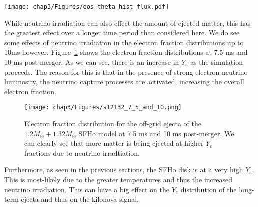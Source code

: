 \begin{figure*}[!htbp]
  \texttt{[image: chap3/Figures/eos\_theta\_hist\_flux.pdf]}
\caption{
  Neutrino flux density moment as a function of angle for different EOS runs at 7.5ms. The angle is defined with respect to the equatorial plane with $0^\circ$ being the equator, and $\pm 90^\circ$ being the North and South poles. The different neutrino species are color coded.
}
\label{fig:theta_nu_eos}
\end{figure*}


While neutrino irradiation can also effect the amount of ejected matter, this has the greatest effect over a longer time period than considered here. We do see some effects of neutrino irradiation in the electron fraction distributions up to 10ms however. Figure~\ref{fig:s12132_75_and_10} shows the electron fraction distributions at 7.5-ms and 10-ms post-merger. As we can see, there is an increase in $Y_e$ as the simulation proceeds. The reason for this is that in the presence of strong electron neutrino luminosity, the neutrino capture processes are activated, increasing the overall electron fraction.

\begin{figure}
  \texttt{[image: chap3/Figures/s12132\_7\_5\_and\_10.png]}
\caption{
  Electron fraction distribution for the off-grid ejecta of the $1.2M_\odot + 1.32M_\odot$ SFHo model at 7.5 ms and 10 ms post-merger. We can clearly see that more matter is being ejected at higher $Y_e$ fractions due to neutrino irradtiation.
}
\label{fig:s12132_75_and_10}
\end{figure}
%
Furthermore, as seen in the previous sections, the SFHo disk is at a very high $Y_e$. This is most-likely due to the greater temperatures and thus the increased neutrino irradiation. This can have a big effect on the $Y_e$ distribution of the long-term ejecta and thus on the kilonova signal.


